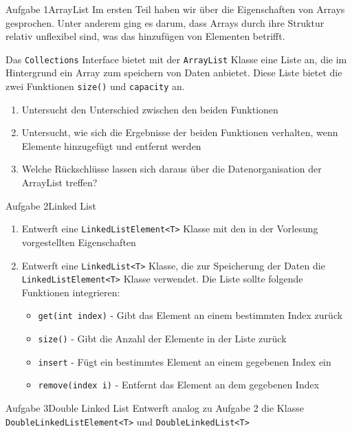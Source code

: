 \begin{frame}{Aufgabe 1}{ArrayList}
Im ersten Teil haben wir über die Eigenschaften von Arrays gesprochen. Unter anderem ging es darum, 
dass Arrays durch ihre Struktur relativ unflexibel sind, was das hinzufügen von Elementen betrifft.

Das \texttt{Collections} Interface bietet mit der \texttt{ArrayList} Klasse eine Liste an, die im Hintergrund
ein Array zum speichern von Daten anbietet. Diese Liste bietet die zwei Funktionen \texttt{size()} und \texttt{capacity} an.
\begin{enumerate}
	\item Untersucht den Unterschied zwischen den beiden Funktionen
	\item Untersucht, wie sich die Ergebnisse der beiden Funktionen verhalten, wenn Elemente hinzugefügt und entfernt werden
	\item Welche Rückschlüsse lassen sich daraus über die Datenorganisation der ArrayList treffen?
\end{enumerate}
\end{frame}

\begin{frame}{Aufgabe 2}{Linked List}
	\begin{enumerate}
		\item Entwerft eine \texttt{LinkedListElement<T>} Klasse mit den in der Vorlesung vorgestellten Eigenschaften
		\item Entwerft eine \texttt{LinkedList<T>} Klasse, die zur Speicherung der Daten die \texttt{LinkedListElement<T>} Klasse verwendet. Die Liste sollte folgende Funktionen integrieren:
		\begin{itemize}
			\item \texttt{get(int index)} - Gibt das Element an einem bestimmten Index zurück
			\item \texttt{size()} - Gibt die Anzahl der Elemente in der Liste zurück
			\item \texttt{insert} - Fügt ein bestimmtes Element an einem gegebenen Index ein
			\item \texttt{remove(index i)} - Entfernt das Element an dem gegebenen Index
		\end{itemize}
	\end{enumerate}
\end{frame}

\begin{frame}{Aufgabe 3}{Double Linked List}
Entwerft analog zu Aufgabe 2 die Klasse \texttt{DoubleLinkedListElement<T>} und \texttt{DoubleLinkedList<T>}
\end{frame}